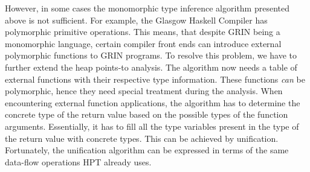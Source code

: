 \documentclass[main.tex]{subfiles}
\begin{document}
	However, in some cases the monomorphic type inference algorithm presented above is not sufficient. For example, the Glasgow Haskell Compiler has polymorphic primitive operations. This means, that despite GRIN being a monomorphic language, certain compiler front ends can introduce external polymorphic functions to GRIN programs. To resolve this problem, we have to further extend the heap points-to analysis. The algorithm now needs a table of external functions with their respective type information. These functions \emph{can} be polymorphic, hence they need special treatment during the analysis. When encountering external function applications, the algorithm has to determine the concrete type of the return value based on the possible types of the function arguments. Essentially, it has to fill all the type variables present in the type of the return value with concrete types. This can be achieved by unification. Fortunately, the unification algorithm can be expressed in terms of the same data-flow operations HPT already uses.
	
	
\end{document}
